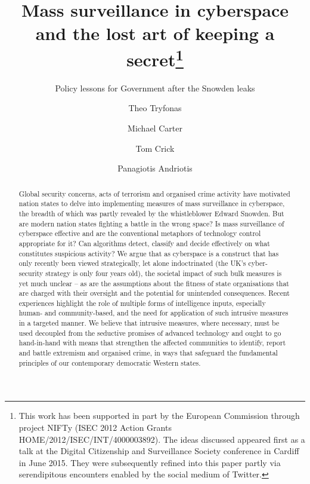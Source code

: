 \documentclass{llncs}
\begin{document}
\title{Mass surveillance in cyberspace and the lost art of keeping a secret\thanks{This work has been supported in part by the European Commission through project NIFTy (ISEC 2012 Action Grants HOME/2012/ISEC/INT/4000003892). The ideas discussed appeared first as a talk at the Digital Citizenship and Surveillance Society conference in Cardiff in June 2015. They were subsequently refined into this paper partly via serendipitous encounters enabled by the social medium of Twitter.}}
\subtitle{Policy lessons for Government after the Snowden leaks}

\author{Theo Tryfonas \and Michael Carter \and Tom Crick \and Panagiotis Andriotis}

\maketitle

\begin{abstract}
Global security concerns, acts of terrorism and organised crime activity have motivated nation states to delve into implementing measures of mass surveillance in cyberspace, the breadth of which was partly revealed by the whistleblower Edward Snowden. But are modern nation states fighting a battle in the wrong space? Is mass surveillance of cyberspace effective and are the conventional metaphors of technology control appropriate for it? Can algorithms detect, classify and decide effectively on what constitutes suspicious activity? We argue that as cyberspace is a construct that has only recently been viewed strategically, let alone indoctrinated (the UK’s cyber-security strategy is only four years old), the societal impact of such bulk measures is yet much unclear -- as are the assumptions about the fitness of state organisations that are charged with their oversight and the potential for unintended consequences. Recent experiences highlight the role of multiple forms of intelligence inputs, especially human- and community-based, and the need for application of such intrusive measures in a targeted manner. We believe that intrusive measures, where necessary, must be used decoupled from the seductive promises of advanced technology and ought to go hand-in-hand with means that strengthen the affected communities to identify, report and battle extremism and organised crime, in ways that safeguard the fundamental principles of our contemporary democratic Western states.
\end{abstract}
\end{document}
